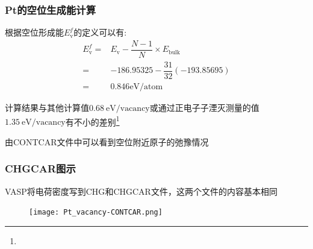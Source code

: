 \frame
{
	\frametitle{\textrm{Pt}的空位生成能计算}
根据空位形成能$E_{\mathrm{v}}^f$的定义可以有:~
\begin{displaymath}
	\begin{aligned}
		E_{\mathrm{v}}^f=&E_{\mathrm{v}}-\dfrac{N-1}N\times E_{\mathrm{bulk}}\\
		=&-186.95325-\dfrac{31}{32}(-193.85695)\\
		=&0.846\mathrm{eV/atom}
	\end{aligned}
\end{displaymath}
{\fontsize{6.2pt}{5.2pt}}

计算结果与其他计算值$0.68\mathrm{~eV/vacancy}$或通过正电子子湮灭测量的值$1.35\mathrm{~eV/vacancy}$有不小的差别\footnote{\fontsize{6.2pt}{5.2pt}}

由\textrm{CONTCAR}文件中可以看到空位附近原子的弛豫情况%
}
\frame
{
	\frametitle{\textrm{CHGCAR}图示}
\textrm{VASP}将电荷密度写到\textrm{CHG}和\textrm{CHGCAR}文件，这两个文件的内容基本相同%
\begin{figure}[h!]
\centering
\vskip -5pt
\texttt{[image: Pt\_vacancy-CONTCAR.png]}
\caption{\fontsize{6.2pt}{5.2pt}}%
\label{Pt_vacancy-CHGCAR}
\end{figure}
}

